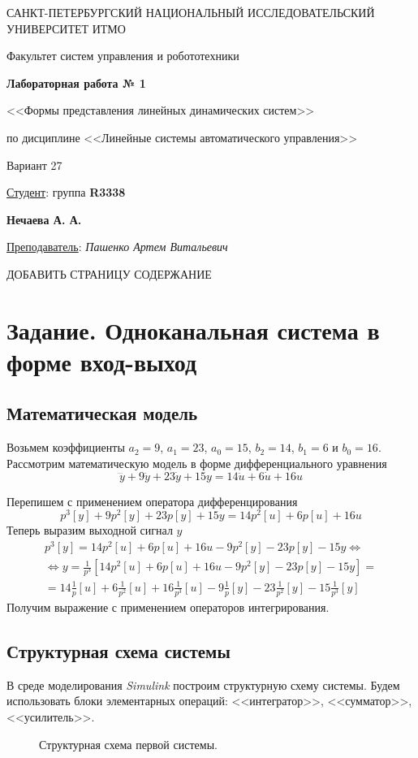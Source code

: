 \documentclass[a5paper, 10pt]{article}
\theoremstyle{definition}
\theoremstyle{plain}
\theoremstyle{remark}
\newcommand*{\titlePage}{
	\thispagestyle{title}
	\begingroup
	\begin{center}
		\vspace*{6ex}
		
		{\small
			САНКТ-ПЕТЕРБУРГСКИЙ НАЦИОНАЛЬНЫЙ ИССЛЕДОВАТЕЛЬСКИЙ УНИВЕРСИТЕТ ИТМО	
		}
		
		\vspace*{2ex}
		
		{\normalsize
			Факультет систем управления и робототехники
		}
		
		\vspace*{15ex}
		
		{\Large \bfseries 
			Лабораторная работа № 1
		}
\vspace*{2ex}
	{\Large \bfseries 
			
<<Формы представления линейных динамических систем>>
		}
\vspace*{2ex}
		
		{\normalsize
			по дисциплине <<Линейные системы автоматического управления>>
		}
\vspace*{2ex}
	{\Large \bfseries 
			
Вариант 27
		}

	\end{center}
	\vspace*{20ex}
	\begin{flushright}
		{\large 
			\underline{Студент}: группа \textbf{R3338}\\
			\begin{flushright}
				\textbf{Нечаева А. А.}\\
			\end{flushright}
		}
		
		\vspace*{5ex}
		
		{\large 
			\underline{Преподаватель}: \textit{Пашенко Артем Витальевич}
		}
	\end{flushright}	
	\newpage
	\setcounter{page}{1}
	\endgroup}
\begin{document}
	\titlePage
	\pagestyle{style}
\newpage

ДОБАВИТЬ СТРАНИЦУ СОДЕРЖАНИЕ

\section{Задание. Одноканальная система в форме вход-выход}
\subsection{Математическая модель}
Возьмем коэффициенты $a_2 = 9$, $a_1 = 23$, $a_0 = 15$, $b_2 = 14$, $b_1 = 6$ и $b_0 = 16$. Рассмотрим математическую модель в форме дифференциального уравнения
\begin{equation}
\dddot{y} + 9\ddot{y} + 23 \dot{y} + 15 y = 14 \ddot{u} + 6 \dot{u} + 16 u
\end{equation}

Перепишем с применением оператора дифференцирования
\begin{equation}
p^3[y] + 9p^2[y] + 23 p[y] + 15 y = 14 p^2[u] + 6 p[u] + 16 u
\end{equation}
Теперь выразим выходной сигнал $y$
\begin{multline}
p^3[y] = 14 p^2[u] + 6 p[u] + 16 u - 9p^2[y] - 23 p[y] - 15 y  \Leftrightarrow \\
 \Leftrightarrow y = \frac{1}{p^3} \left[ 14 p^2[u] + 6 p[u] + 16 u - 9p^2[y] - 23 p[y] - 15 y \right] = \\
= 14 \frac{1}{p}[u] + 6 \frac{1}{p^2}[u] + 16 \frac{1}{p^3}[u] - 9 \frac{1}{p}[y] - 23 \frac{1}{p^2}[y] - 15 \frac{1}{p^3}[y]
\end{multline}
Получим выражение с применением операторов интегрирования. 

\subsection{Структурная схема системы}
В среде моделирования \textit{Simulink} построим структурную схему системы. Будем использовать блоки элементарных операций: <<интегратор>>, <<сумматор>>, <<усилитель>>.

\begin{figure}[h]
\caption{Структурная схема первой системы.}
\end{figure}
\end{document}
